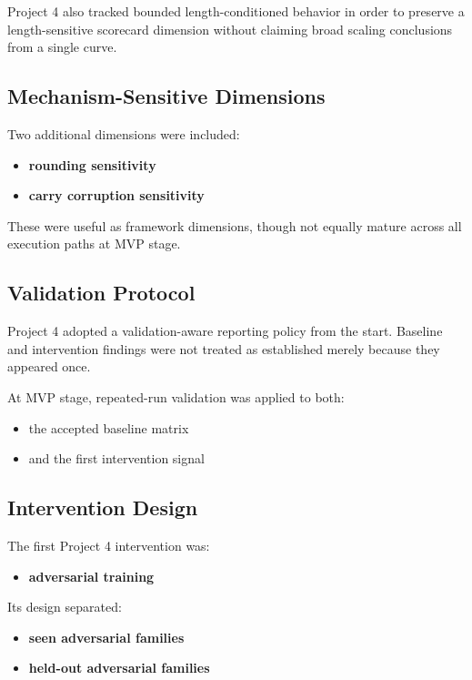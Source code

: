 \documentclass[11pt]{article}
\begin{document}
Project 4 also tracked bounded length-conditioned behavior in order to preserve a length-sensitive scorecard dimension without claiming broad scaling conclusions from a single curve.

\subsection{Mechanism-Sensitive Dimensions}

Two additional dimensions were included:
\begin{itemize}[leftmargin=1.5em]
    \item \textbf{rounding sensitivity}
    \item \textbf{carry corruption sensitivity}
\end{itemize}

These were useful as framework dimensions, though not equally mature across all execution paths at MVP stage.

\subsection{Validation Protocol}

Project 4 adopted a validation-aware reporting policy from the start. Baseline and intervention findings were not treated as established merely because they appeared once.

At MVP stage, repeated-run validation was applied to both:
\begin{itemize}[leftmargin=1.5em]
    \item the accepted baseline matrix
    \item and the first intervention signal
\end{itemize}

\subsection{Intervention Design}

The first Project 4 intervention was:
\begin{itemize}[leftmargin=1.5em]
    \item \textbf{adversarial training}
\end{itemize}

Its design separated:
\begin{itemize}[leftmargin=1.5em]
    \item \textbf{seen adversarial families}
    \item \textbf{held-out adversarial families}
\end{itemize}
\end{document}
